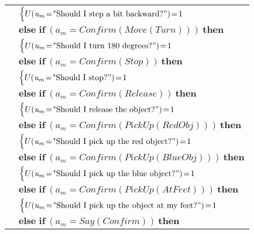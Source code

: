 \begin{footnotesize}
\begin{longtable}{p{2cm}l}
& \;\;\;\;\; $ \begin{cases}U(\mathit{u_m}\!=\!\text{"Should I step a bit backward?}")\!=\!1 \end{cases}$ \vspace{1mm} \\ & $ \textbf{else if} \ (\mathit{a_m}\!=\!\mathit{Confirm(Move(Turn))}) \ \textbf{then}$ \\
& \;\;\;\;\; $ \begin{cases}U(\mathit{u_m}\!=\!\text{"Should I turn 180 degrees?}")\!=\!1 \end{cases}$ \vspace{1mm} \\ & $ \textbf{else if} \ (\mathit{a_m}\!=\!\mathit{Confirm(Stop)}) \ \textbf{then}$ \\
& \;\;\;\;\; $ \begin{cases}U(\mathit{u_m}\!=\!\text{"Should I stop?}")\!=\!1 \end{cases}$ \vspace{1mm} \\ & $ \textbf{else if} \ (\mathit{a_m}\!=\!\mathit{Confirm(Release)}) \ \textbf{then}$ \\
& \;\;\;\;\; $ \begin{cases}U(\mathit{u_m}\!=\!\text{"Should I release the object?}")\!=\!1 \end{cases}$ \vspace{1mm} \\ & $ \textbf{else if} \ (\mathit{a_m}\!=\!\mathit{Confirm(PickUp(RedObj))}) \ \textbf{then}$ \\
& \;\;\;\;\; $ \begin{cases}U(\mathit{u_m}\!=\!\text{"Should I pick up the red object?}")\!=\!1 \end{cases}$ \vspace{1mm} \\ & $ \textbf{else if} \ (\mathit{a_m}\!=\!\mathit{Confirm(PickUp(BlueObj))}) \ \textbf{then}$ \\
& \;\;\;\;\; $ \begin{cases}U(\mathit{u_m}\!=\!\text{"Should I pick up the blue object?}")\!=\!1 \end{cases}$ \vspace{1mm} \\ & $ \textbf{else if} \ (\mathit{a_m}\!=\!\mathit{Confirm(PickUp(AtFeet))}) \ \textbf{then}$ \\
& \;\;\;\;\; $ \begin{cases}U(\mathit{u_m}\!=\!\text{"Should I pick up the object at my feet?}")\!=\!1 \end{cases}$ \vspace{1mm} \\ & $ \textbf{else if} \ (\mathit{a_m}\!=\!\mathit{Say(Confirm)}) \ \textbf{then}$ \\

\end{longtable}
\end{footnotesize}
